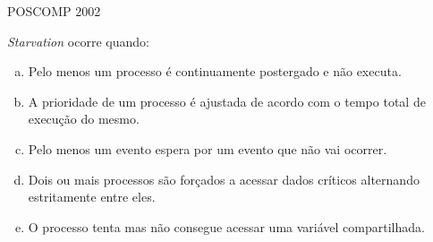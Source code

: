 \documentclass[aspectratio=169,
				xcolor=table]{beamer}
\begin{document}
	\begin{frame}{POSCOMP 2002}

		\textit{Starvation} ocorre quando:
		
		\begin{enumerate}[a)]
			\item Pelo menos um processo é continuamente postergado e não executa.
			\item A prioridade de um processo é ajustada de acordo com o tempo total de execução do mesmo.
			\item Pelo menos um evento espera por um evento que não vai ocorrer.
			\item Dois ou mais processos são forçados a acessar dados críticos alternando estritamente entre eles.
			\item O processo tenta mas não consegue acessar uma variável compartilhada.
			
		\end{enumerate}
	\end{frame}
\end{document}
